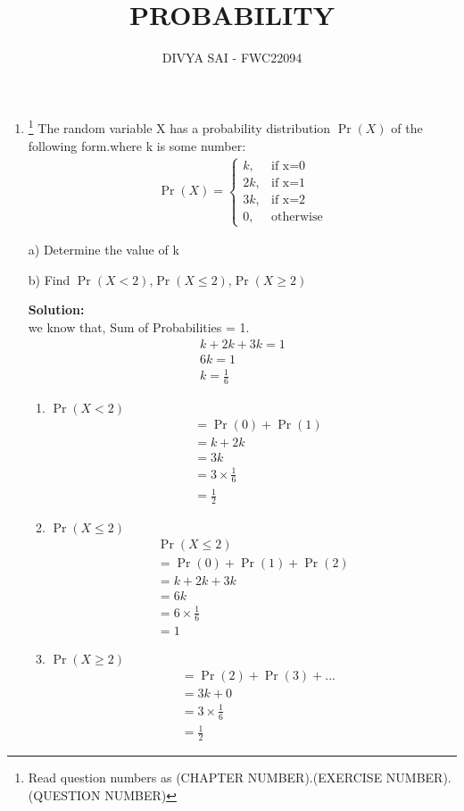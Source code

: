 \documentclass{article}
\providecommand{\pr}[1]{\ensuremath{\Pr\left(#1\right)}}
\newcommand{\solution}{\noindent \textbf{Solution: }}
\begin{document}
\title{PROBABILITY}
\author{\Large DIVYA SAI - FWC22094}
\date{}

\maketitle
\begin{enumerate}
[label=16.\arabic{enumi}.\arabic{enumii}]%
\setcounter{enumi}{3}
\setcounter{enumii}{10}

\item \footnote{Read question numbers as (CHAPTER NUMBER).(EXERCISE NUMBER).(QUESTION NUMBER)} {The random variable X has a probability distribution \pr{X} of the following form.where k is some number: }
\begin{align}
  \pr{X} =
    \begin{cases}
      k,  & \text{if x=0}\\
      2k, & \text{if x=1}\\
      3k, & \text{if x=2}\\
      0 , & \text{otherwise}
    \end{cases}       
\end{align}

a) Determine the value of k 

b) Find \pr{X < 2},\pr{X \leq 2},\pr{X \geq 2}  


\solution\\
we know that,
Sum of Probabilities = 1.
\begin{align}
&k + 2k + 3k  = 1 &\\
&6k = 1 &\\
&k = \frac{1}{6}&
\end{align}
 \begin{enumerate}
        \item \pr{X < 2}
          \begin{align}
          &= \pr{0}+\pr{1}\\
          &= k+2k\\
          &= 3k\\
          &=3\times\frac{1}{6}\\
          &= \frac{1}{2}
        \end{align}
        \item \pr{X \leq 2}
        \begin{align}
         &\pr{X \le 2}&\\
         &= \pr{0}+\pr{1}+\pr{2}\\
         &= k+2k+3k\\
         &= 6k\\
         &= 6 \times \frac{1}{6}\\
         &= 1
         \end{align}
        \item \pr{X \geq 2}
        \begin{align}
           &= \pr{2}+\pr{3}+...\\
           &= 3k+0\\
           &= 3 \times \frac{1}{6}\\
           & = \frac{1}{2}
        \end{align}     
\end{enumerate}
\end{enumerate}
\end{document}
